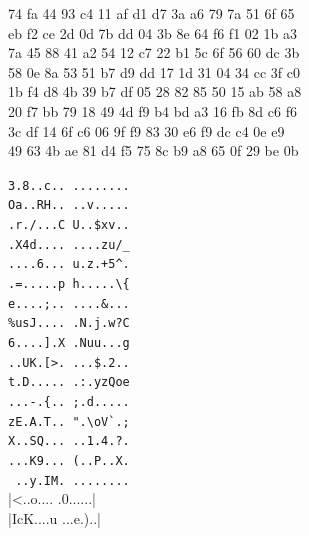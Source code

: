 {\begin{minipage}[t]{0.6\linewidth}
74 fa 44 93 c4 11 af d1  d7 3a a6 79 7a 51 6f 65\\
eb f2 ce 2d 0d 7b dd 04  3b 8e 64 f6 f1 02 1b a3\\
7a 45 88 41 a2 54 12 c7  22 b1 5c 6f 56 60 dc 3b\\
58 0e 8a 53 51 b7 d9 dd  17 1d 31 04 34 cc 3f c0\\
1b f4 d8 4b 39 b7 df 05  28 82 85 50 15 ab 58 a8\\
20 f7 bb 79 18 49 4d f9  b4 bd a3 16 fb 8d c6 f6\\
\color{orange}
3c df 14 6f c6 06 9f f9  83 30 e6 f9 dc c4 0e e9\\
49 63 4b ae 81 d4 f5 75  8c b9 a8 65 0f 29 be 0b\\
\end{minipage}
\begin{minipage}[t]{0.3\linewidth}%
\color{RawSienna}
\verb  |3.8..c.. ........|\\
\verb  |Oa..RH.. ..v.....|\\
\verb  |.r./...C U..$xv..|\\
\verb  |.X4d.... ....zu/_|\\
\verb  |....6... u.z.+5^.|\\
\verb  |.=.....p h.....\{|\\
\verb  |e....;.. ....&...|\\
\verb  |%
\verb  |6....].X .Nuu...g|\\
\verb  |..UK.[>. ...$.2..|\\
\verb  |t.D..... .:.yzQoe|\\
\verb  |...-.{.. ;.d.....|\\
\verb  |zE.A.T.. ".\oV`.;|\\
\verb  |X..SQ... ..1.4.?.|\\
\verb  |...K9... (..P..X.|\\
\verb  | ..y.IM. ........|\\
 |<..o.... .0......|\\
 |IcK....u ...e.)..|\\
\end{minipage}\\
}
